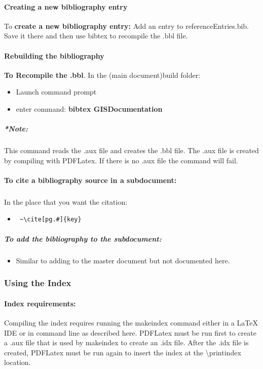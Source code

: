 \documentclass[class=book , crop=false]{standalone}
\begin{document}
\paragraph{Creating a new bibliography entry}
To \textbf{create a new bibliography entry:} Add an entry to referenceEntries.bib.  Save it there and then use bibtex to recompile the .bbl file.
\paragraph{Rebuilding the bibliography}
\textbf{To Recompile the .bbl}.  In the (main document)build folder:
\begin{itemize}
\item Launch command prompt
\item enter command: \textbf{{\large bibtex GISDocumentation}}
\end{itemize}
\subparagraph{*Note:} {\footnotesize This command reads the .aux file and creates the .bbl file.  The .aux file is created by compiling with PDFLatex.  If there is no .aux file the command will fail.}

\paragraph{To cite a bibliography source in a subdocument:}
\subparagraph{}In the place that you want the citation:
\begin{itemize}
\item \begin{verbatim} ~\cite[pg.#]{key}\end{verbatim}
\end{itemize}
\subparagraph{To add the bibliography to the subdocument:}
\begin{itemize}
\item Similar to adding to the master document but not documented here.
\end{itemize}


\subsubsection[Using the Index]{{\Large Using the Index}}
\paragraph{Index requirements:}
Compiling the index requires running the makeindex command either in a \LaTeX{} IDE or in command line as described here.  PDFLatex must be run first to create a .aux file that is used by makeindex to create an .idx file.  After the .idx file is created, PDFLatex must be run again to insert the index at the \textbackslash printindex location.
\end{document}
